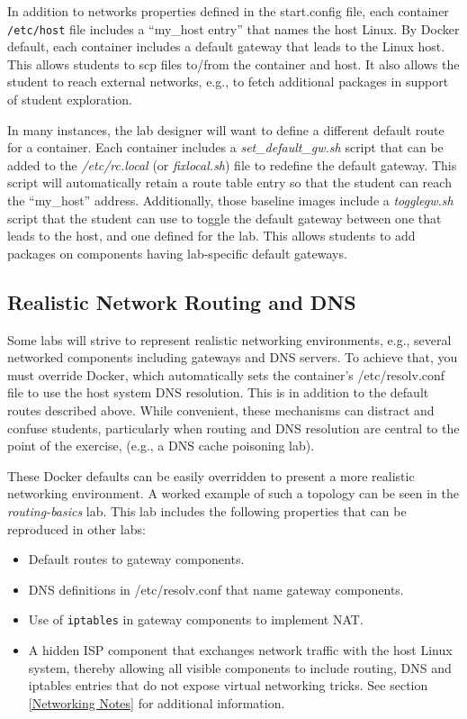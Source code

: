 \documentclass[12pt]{article}
\begin{document}
In addition to networks properties defined in the
start.config file, each container \texttt{/etc/host} file includes a ``my\_host entry'' that names
the host Linux.  By Docker default, each container includes a default gateway that
leads to the Linux host.  This allows students to scp files to/from the container and host.
It also allows the student to reach external networks, e.g., to fetch additional packages in
support of student exploration.

In many instances, the lab designer will want to define a different default route for a 
container.  Each container includes a \textit{set\_default\_gw.sh}
script that can be added to the \textit{/etc/rc.local} (or \textit{fixlocal.sh}) file to redefine the default gateway.
This script will automatically retain a route table entry so that the student can reach the ``my\_host''
address.  Additionally, those baseline images include a \textit{togglegw.sh} script that the student
can use to toggle the default gateway between one that leads to the host, and one defined for the lab.
This allows students to add packages on components having lab-specific default gateways.

\subsection{Realistic Network Routing and DNS}
Some labs will strive to represent realistic networking environments, 
e.g., several networked components including gateways and DNS servers.
To achieve that, you must override Docker, which automatically sets 
the container's /etc/resolv.conf file to use the
host system DNS resolution.  This is in addition to the default routes described
above.  While convenient, these mechanisms can distract and confuse students, particularly
when routing and DNS resolution are central to the point of the exercise, (e.g.,
a DNS cache poisoning lab).

These Docker defaults can be easily overridden to present a more realistic networking
environment.  A worked example of such a topology can be seen in the \textit{routing-basics} lab.
This lab includes the following properties that can be reproduced in other labs:
\begin{itemize}
\item Default routes to gateway components.
\item DNS definitions in /etc/resolv.conf that name gateway components.
\item Use of \texttt{iptables} in gateway components to implement NAT.
\item A hidden ISP component that exchanges network traffic with the host Linux system,
thereby allowing all visible components to include routing, DNS and iptables entries that do not
expose virtual networking tricks.  See section \ref{Networking Notes} for additional information.

\end{itemize}
\end{document}

